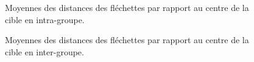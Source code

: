 \begin{figure}%
	\centering
    \caption[Moyennes des distances des fléchettes par rapport au centre en intra-groupe]{Moyennes des distances des fléchettes par rapport au centre de la cible en intra-groupe.}
    \label{fig:Precision_All_data_intragroupe}
\end{figure}


\begin{figure}%
	\centering
    \caption[Moyennes des distances des fléchettes par rapport au centre en inter-groupe]{Moyennes des distances des fléchettes par rapport au centre de la cible en inter-groupe.}
    \label{fig:Precision_All_data_intergroupe}
\end{figure}



